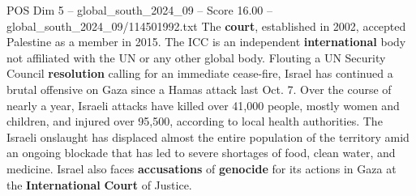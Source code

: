 \begin{textsample}{POS Dim 5 – global\_south\_2024\_09 – Score 16.00 – global\_south\_2024\_09/114501992.txt}
The \textbf{court}, established in 2002, accepted Palestine as a member in 2015.
The ICC is an independent \textbf{international} body not affiliated with the UN or any other global body.
Flouting a UN Security Council \textbf{resolution} calling for an immediate cease-fire, Israel has continued a brutal offensive on Gaza since a Hamas attack last Oct. 7.
Over the course of nearly a year, Israeli attacks have killed over 41,000 people, mostly women and children, and injured over 95,500, according to local health authorities.
The Israeli onslaught has displaced almost the entire population of the territory amid an ongoing blockade that has led to severe shortages of food, clean water, and medicine.
Israel also faces \textbf{accusations} of \textbf{genocide} for its actions in Gaza at the \textbf{International} \textbf{Court} of Justice.

\end{textsample}
